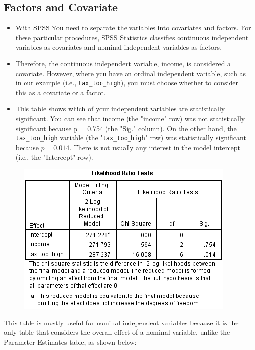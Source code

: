 \documentclass[a4paper,12pt]{article}
\begin{document}
\subsection*{Factors and Covariate}
\begin{itemize} 
\item With SPSS You need to separate the variables into covariates and factors. For these particular procedures, SPSS Statistics classifies continuous independent variables as covariates and nominal independent variables as factors. 
\item Therefore, the continuous independent variable, income, is considered a covariate. However, where you have an ordinal independent variable, such as in our example (i.e., \texttt{tax\_too\_high}), you must choose whether to consider this as a covariate or a factor. 
\item 
This table shows which of your independent variables are statistically significant. You can see that income (the "income" row) was not statistically significant because p = 0.754 (the "Sig." column). On the other hand, the \texttt{tax\_too\_high} variable (the "\texttt{tax\_too\_high}" row) was statistically significant because $p = 0.014$. There is not usually any interest in the model intercept (i.e., the "Intercept" row).
\end{itemize}
\begin{figure}[h!]
	\centering
	\includegraphics[width=0.7\linewidth]{images/likelihood-test}
	\caption{}
	\label{fig:likelihood-test}
\end{figure}

This table is mostly useful for nominal independent variables because it is the only table that considers the overall effect of a nominal variable, unlike the Parameter Estimates table, as shown below:
\end{document}
